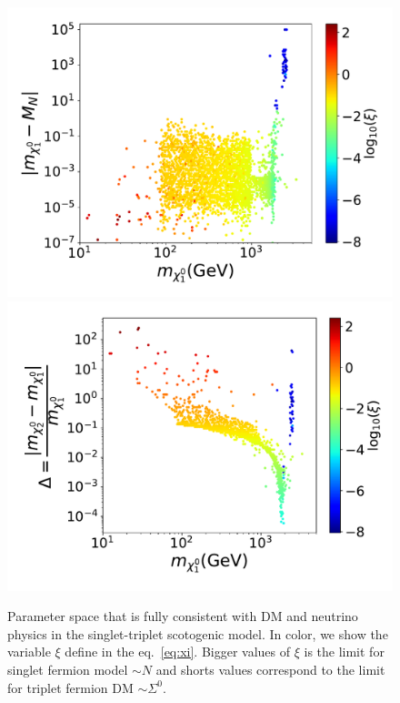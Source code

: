 \documentclass[12pt,letterpaper]{article}
\begin{document}
\begin{figure}
\begin{center}
\includegraphics[scale=0.43]{mxoMN_with_neutrino_physics}
\includegraphics[scale=0.43]{mxoMTF_with_neutrino_physics}
\caption{Parameter space that is fully consistent with DM and neutrino physics in the singlet-triplet scotogenic model. In color, we show the variable $\xi$ define in the eq.~\ref{eq:xi}. Bigger values of $\xi$ is the limit for singlet fermion model $\sim N$ and shorts values correspond to the limit for triplet fermion DM $\sim \Sigma^0$.}
\label{fig:MN-and-MTF}
\end{center}
\end{figure}
%
\end{document}
